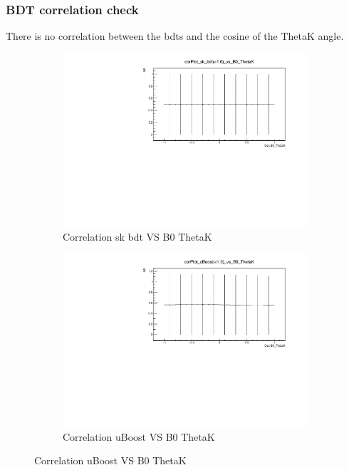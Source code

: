 \documentclass{beamer}
\begin{document}
\begin{frame}
\frametitle{BDT correlation check}
There is no correlation between the bdts and the cosine of the ThetaK angle.
 \begin{figure}
 \centering
 \begin{subfigure}{0.5\textwidth}
 \centering
 \includegraphics[width=1.0\linewidth]{plots/corPlot_sk_bdt(<1.0)_vs_B0_ThetaK.pdf}
 \caption{Correlation sk bdt VS B0 ThetaK}
 \end{subfigure}%
\begin{subfigure}{0.5\textwidth}
\centering
\includegraphics[width=1.0\linewidth]{plots/corPlot_uBoost(<1.0)_vs_B0_ThetaK.pdf}
\caption{Correlation uBoost VS B0 ThetaK}
\end{subfigure}
\end{figure}
\end{frame}
\end{document}
